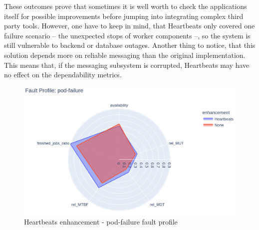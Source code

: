 These outcomes prove that sometimes it is well worth to check the applications itself for possible improvements before jumping into integrating complex third party tools. However, one have to keep in mind, that Heartbeats only covered one failure scenario -- the unexpected stops of worker components --, so the system is still vulnerable to backend or database outages. Another thing to notice, that this solution depends more on reliable messaging than the original implementation. This means that, if the messaging subsystem is corrupted, Heartbeats may have no effect on the dependability metrics.



\begin{figure}[h]
	\centering
	\includegraphics[width=140mm, keepaspectratio]{figures/heartbeats_with_base_pod-failure.png}
	\caption{Heartbeats enhancement - pod-failure fault profile}
	\label{fig:heartbeats-results-pod-failure}
\end{figure}

